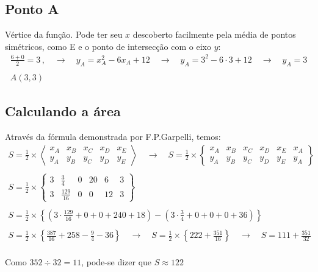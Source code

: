 \documentclass[a4paper,12pt,final]{article}
\begin{document}
\subsection*{Ponto A}
Vértice da função. Pode ter seu $x$ descoberto facilmente pela média de pontos simétricos, como E e o ponto de intersecção com o eixo $y$:
\begin{gather*}
\frac{6 + 0}{2} = 3\,,\quad\longrightarrow\quad
y_A = x_A^2 - 6x_A + 12\quad\rightarrow\quad
y_A = 3^2 - 6\cdot 3 + 12\quad\rightarrow\quad
y_A = 3\\\\
\boxed{A(3,3)}
\end{gather*}

\subsection*{Calculando a área}
Através da fórmula demonstrada por F.P.Garpelli, temos:
\begin{gather*}
S = \frac{1}{2}\times
\left\langle\begin{array}{ccccc}
x_A & x_B & x_C & x_D & x_E\\
y_A & y_B & y_C & y_D & y_E
\end{array}\right\rangle\quad\rightarrow\quad
S = \frac{1}{2}\times
\left\{\begin{array}{cccccc}
x_A & x_B & x_C & x_D & x_E & x_A\\
y_A & y_B & y_C & y_D & y_E & y_A
\end{array}\right\}\\\\
S = \frac{1}{2}\times
\left\{\begin{array}{cccccc}
3 & \frac{3}{4} & 0 & 20 & 6 & 3\\[.1cm]
3 & \frac{129}{16} & 0 & 0 & 12 & 3
\end{array}\right\}\\\\
S = \frac{1}{2}\times\left\{\left(3\cdot \frac{129}{16} + 0 + 0 + 240 + 18\right) - \left(3\cdot\frac{3}{4} + 0 + 0 + 0 + 36\right)\right\}\\\\
S = \frac{1}{2}\times\left\{\frac{387}{16} + 258 - \frac{9}{4} - 36\right\}\quad\rightarrow\quad
S = \frac{1}{2}\times\left\{222 + \frac{351}{16}\right\}\quad\rightarrow\quad
S = 111 + \frac{351}{32}
\end{gather*}\\
Como $352 \div 32 = 11$, pode-se dizer que $\boxed{S \approx 122}$
\end{document}
